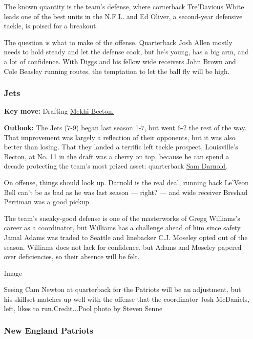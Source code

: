 The known quantity is the team's defense, where cornerback Tre'Davious
White leads one of the best units in the N.F.L. and Ed Oliver, a
second-year defensive tackle, is poised for a breakout.

The question is what to make of the offense. Quarterback Josh Allen
mostly needs to hold steady and let the defense cook, but he's young,
has a big arm, and a lot of confidence. With Diggs and his fellow wide
receivers John Brown and Cole Beasley running routes, the temptation to
let the ball fly will be high.

\hypertarget{jets}{%
\subsubsection{\texorpdfstring{\textbf{Jets}}{Jets}}\label{jets}}

\textbf{Key move:} Drafting
\href{https://www.nytimes3xbfgragh.onion/2020/04/28/sports/football/jets-mekhi-becton-draft.html}{Mekhi
Becton.}

\textbf{Outlook:} The Jets (7-9) began last season 1-7, but went 6-2 the
rest of the way. That improvement was largely a reflection of their
opponents, but it was also better than losing. That they landed a
terrific left tackle prospect, Louisville's Becton, at No. 11 in the
draft was a cherry on top, because he can spend a decade protecting the
team's most prized asset: quarterback
\href{https://www.nytimes3xbfgragh.onion/2019/11/24/sports/football/sam-darnold-jets.html}{Sam
Darnold}.

On offense, things should look up. Darnold is the real deal, running
back Le'Veon Bell can't be as bad as he was last season --- right? ---
and wide receiver Breshad Perriman was a good pickup.

The team's sneaky-good defense is one of the masterworks of Gregg
Williams's career as a coordinator, but Williams has a challenge ahead
of him since safety Jamal Adams was traded to Seattle and linebacker
C.J. Moseley opted out of the season. Williams does not lack for
confidence, but Adams and Moseley papered over deficiencies, so their
absence will be felt.

Image

Seeing Cam Newton at quarterback for the Patriots will be an adjustment,
but his skillset matches up well with the offense that the coordinator
Josh McDaniels, left, likes to run.Credit...Pool photo by Steven Senne

\hypertarget{new-england-patriots}{%
\subsubsection{\texorpdfstring{\textbf{New England
Patriots}}{New England Patriots}}\label{new-england-patriots}}

